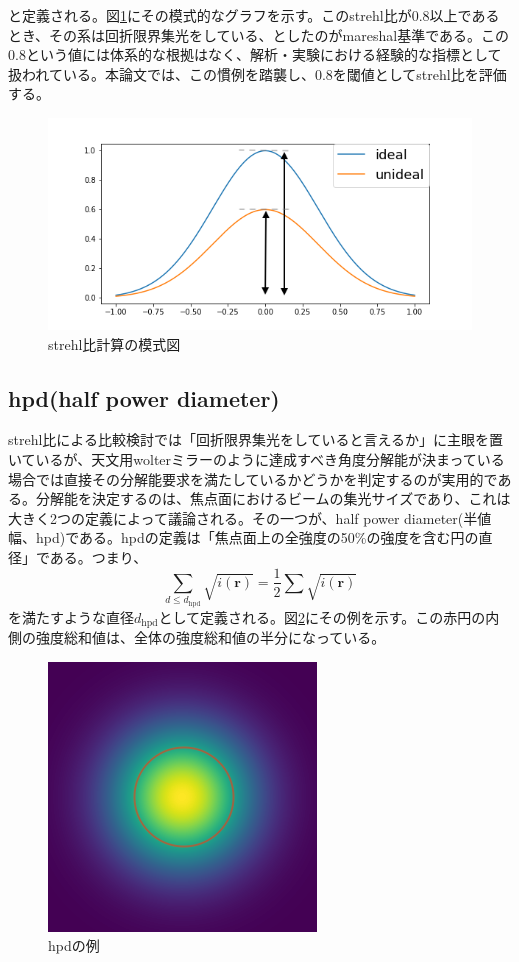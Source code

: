 \documentclass[dvipdfmx,autodetect-engine]{jreport}
\begin{document}
と定義される。図\ref{fig:strehl_explanation}にその模式的なグラフを示す。このstrehl比が0.8以上であるとき、その系は回折限界集光をしている、としたのがmareshal基準である\citep{bornwolf:1999:book}。この0.8という値には体系的な根拠はなく、解析・実験における経験的な指標として扱われている。本論文では、この慣例を踏襲し、0.8を閾値としてstrehl比を評価する。

\begin{figure}[h!]
\centering
\includegraphics[scale=0.6]{images/error_simulation/explanation/strehl.png}
\caption{strehl比計算の模式図}
\label{fig:strehl_explanation}
\end{figure}

\subsection{hpd(half power diameter)}
strehl比による比較検討では「回折限界集光をしていると言えるか」に主眼を置いているが、天文用wolterミラーのように達成すべき角度分解能が決まっている場合では直接その分解能要求を満たしているかどうかを判定するのが実用的である。分解能を決定するのは、焦点面におけるビームの集光サイズであり、これは大きく2つの定義によって議論される。その一つが、half power diameter(半値幅、hpd)である。hpdの定義は「焦点面上の全強度の50\%の強度を含む円の直径」である。つまり、
\[
    \sum_{d\leq d_{\mathrm{hpd}}} \sqrt{ i(\mathbf{r}) } = \frac{1}{2} \sum \sqrt{ i(\mathbf{r}) }
\]
を満たすような直径$d_{\mathrm{hpd}}$として定義される。図\ref{fig:hpd_explanation}にその例を示す。この赤円の内側の強度総和値は、全体の強度総和値の半分になっている。

\begin{figure}[h!]
\centering
\includegraphics[scale=0.6]{images/error_simulation/explanation/hpd.png}
\caption{hpdの例}
\label{fig:hpd_explanation}
\end{figure}
\end{document}
